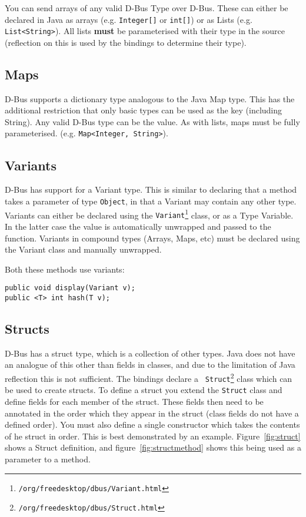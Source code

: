 \documentclass[a4paper,12pt]{article}
\begin{document}
You can send arrays of any valid D-Bus Type over D-Bus. These can
either be declared in Java as arrays (e.g. \verb&Integer[]& or
\verb&int[]&) or as Lists (e.g. \verb&List<String>&). All lists {\bf
must} be parameterised with their type in the source (reflection on
this is used by the bindings to determine their type).

\subsection{Maps}

D-Bus supports a dictionary type analogous to the Java Map type. This
has the additional restriction that only basic types can be used as
the key (including String). Any valid D-Bus type can be the value. As
with lists, maps must be fully parameterised. (e.g.
\verb&Map<Integer, String>&).

\subsection{Variants}

D-Bus has support for a Variant type. This is similar to declaring that a method takes a parameter of type {\tt Object}, in that a Variant may contain any other type. Variants can either be declared using the {\tt Variant\footnote{\javadocroot/org/freedesktop/dbus/Variant.html}} class, or as a Type Variable. In the latter case the value is automatically unwrapped and passed to the function. Variants in compound types (Arrays, Maps, etc) must be declared using the Variant class and manually unwrapped.

Both these methods use variants:

\begin{verbatim}
public void display(Variant v);
public <T> int hash(T v);
\end{verbatim}

\subsection{Structs}

D-Bus has a struct type, which is a collection of other types. Java
does not have an analogue of this other than fields in classes, and
due to the limitation of Java reflection this is not sufficient. The
bindings declare a {\tt
Struct\footnote{\javadocroot/org/freedesktop/dbus/Struct.html}} class which can be used to create structs.
To define a struct you extend the {\tt Struct} class and define fields for each member of the struct.
These fields then need to be annotated in the order which they appear in the struct (class fields do not have a defined order). You must also define a single constructor which takes the contents of he struct in order. This is best demonstrated by an example.
Figure~\ref{fig:struct} shows a Struct definition, and
figure~\ref{fig:structmethod} shows this being used as a parameter
to a method.
\end{document}
